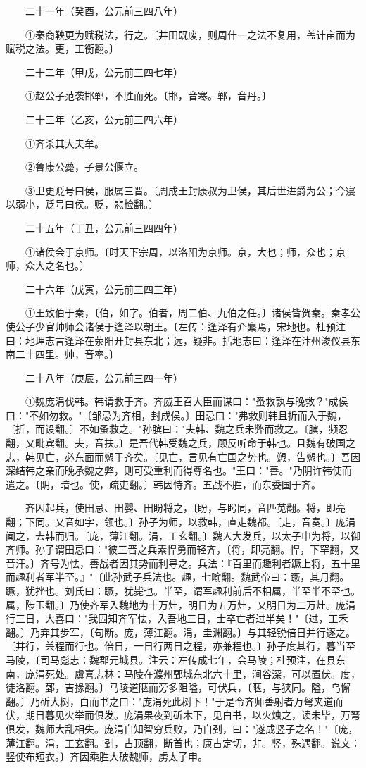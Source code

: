 　　二十一年（癸酉，公元前三四八年）

　　①秦商鞅更为赋税法，行之。〔井田既废，则周什一之法不复用，盖计亩而为赋税之法。更，工衡翻。〕

　　二十二年（甲戌，公元前三四七年）

　　①赵公子范袭邯郸，不胜而死。〔邯，音寒。郸，音丹。〕

　　二十三年（乙亥，公元前三四六年）

　　①齐杀其大夫牟。

　　②鲁康公薨，子景公偃立。

　　③卫更贬号曰侯，服属三晋。〔周成王封康叔为卫侯，其后世进爵为公；今寖以弱小，贬号曰侯。贬，悲检翻。〕

　　二十五年（丁丑，公元前三四四年）

　　①诸侯会于京师。〔时天下宗周，以洛阳为京师。京，大也；师，众也；京师，众大之名也。〕

　　二十六年（戊寅，公元前三四三年）

　　①王致伯于秦，〔伯，如字。伯者，周二伯、九伯之任。〕诸侯皆贺秦。秦孝公使公子少官帅师会诸侯于逢泽以朝王。〔左传：逢泽有介麋焉，宋地也。杜预注曰：地理志言逢泽在荥阳开封县东北；远，疑非。括地志曰：逢泽在汴州浚仪县东南二十四里。帅，音率。〕

　　二十八年（庚辰，公元前三四一年）

　　①魏庞涓伐韩。韩请救于齐。齐威王召大臣而谋曰："蚤救孰与晚救？"成侯曰："不如勿救。"〔邹忌为齐相，封成侯。〕田忌曰："弗救则韩且折而入于魏，〔折，而设翻。〕不如蚤救之。"孙膑曰："夫韩、魏之兵未弊而救之。〔膑，频忍翻，又毗宾翻。夫，音扶。〕是吾代韩受魏之兵，顾反听命于韩也。且魏有破国之志，韩见亡，必东面而愬于齐矣。〔见亡，言见有亡国之势也。愬，告愬也。〕吾因深结韩之亲而晚承魏之弊，则可受重利而得尊名也。"王曰："善。"乃阴许韩使而遣之。〔阴，暗也。使，疏吏翻。〕韩因恃齐。五战不胜，而东委国于齐。

　　齐因起兵，使田忌、田婴、田盼将之，〔盼，与盻同，音匹苋翻。将，即亮翻；下同。又音如字，领也。〕孙子为师，以救韩，直走魏都。〔走，音奏。〕庞涓闻之，去韩而归。〔庞，薄江翻。涓，工玄翻。〕魏人大发兵，以太子申为将，以御齐师。孙子谓田忌曰："彼三晋之兵素悍勇而轻齐，〔将，即亮翻。悍，下罕翻，又音汗。〕齐号为怯，善战者因其势而利导之。兵法：『百里而趣利者蹶上将，五十里而趣利者军半至。』"〔此孙武子兵法也。趣，七喻翻。魏武帝曰：蹶，其月翻。蹶，犹挫也。刘氏曰：蹶，犹毙也。半至，谓军趣利前后不相属，半至半不至也。属，陟玉翻。〕乃使齐军入魏地为十万灶，明日为五万灶，又明日为二万灶。庞涓行三日，大喜曰："我固知齐军怯，入吾地三日，士卒亡者过半矣！"〔过，工禾翻。〕乃弃其步军，〔句断。庞，薄江翻。涓，圭渊翻。〕与其轻锐倍日并行逐之。〔并行，兼程而行也。倍日，一日行两日之程，亦兼程也。〕孙子度其行，暮当至马陵，〔司马彪志：魏郡元城县。注云：左传成七年，会马陵；杜预注，在县东南，庞涓死处。虞喜志林：马陵在濮州鄄城东北六十里，涧谷深，可以置伏。度，徒洛翻。鄄，吉掾翻。〕马陵道陿而旁多阻隘，可伏兵，〔陿，与狭同。隘，乌懈翻。〕乃斫大树，白而书之曰："庞涓死此树下！"于是令齐师善射者万弩夹道而伏，期日暮见火举而俱发。庞涓果夜到斫木下，见白书，以火烛之，读未毕，万弩俱发，魏师大乱相失。庞涓自知智穷兵败，乃自刭，曰："遂成竖子之名！"〔庞，薄江翻。涓，工玄翻。刭，古顶翻，断首也；康古定切，非。竖，殊遇翻。说文：竖使布短衣。〕齐因乘胜大破魏师，虏太子申。

